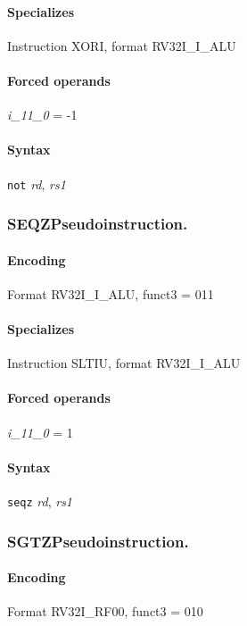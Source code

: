 {\paragraph{Specializes} Instruction XORI, format RV32I\_I\_ALU

\paragraph{Forced operands} \emph{i\_11\_0} = -1

\paragraph{Syntax} \texttt{not} \emph{rd}, \emph{rs1}
\newpage
\subsubsection[{\small SEQZ: Pseudoinstruction.}]{SEQZ\hfill Pseudoinstruction.}
\label{instr:SEQZ}

\paragraph{Encoding} Format \textsf{RV32I\_I\_ALU, funct3 = 011}\\



\paragraph{Specializes} Instruction SLTIU, format RV32I\_I\_ALU

\paragraph{Forced operands} \emph{i\_11\_0} = 1

\paragraph{Syntax} \texttt{seqz} \emph{rd}, \emph{rs1}
\newpage
\subsubsection[{\small SGTZ: Pseudoinstruction.}]{SGTZ\hfill Pseudoinstruction.}
\label{instr:SGTZ}

\paragraph{Encoding} Format \textsf{RV32I\_RF00, funct3 = 010}\\

}
